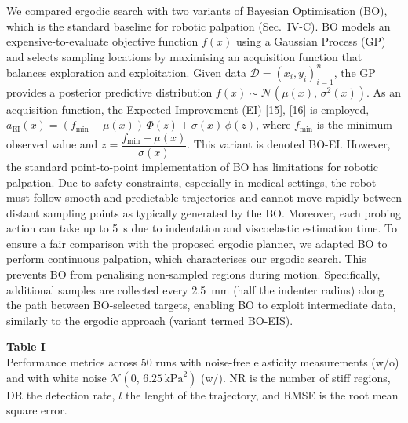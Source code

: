 \documentclass[11pt]{article}
\begin{document}
\noindent
We compared ergodic search with two variants of Bayesian
Optimisation (BO), which is the standard baseline for robotic
palpation (Sec.~IV-C). BO models an expensive-to-evaluate objective
function $f(x)$ using a Gaussian Process (GP) and selects sampling
locations by maximising an acquisition function that balances
exploration and exploitation. Given data
$\mathcal{D} = (x_{i}, y_{i})_{i=1}^{n}$, the GP provides a
posterior predictive distribution
$f(x) \sim \mathcal{N}(\mu(x),\,\sigma^{2}(x))$. As an acquisition
function, the Expected Improvement (EI) [15], [16] is employed,
$a_{\mathrm{EI}}(x) = (f_{\min} - \mu(x))\,\Phi(z) + \sigma(x)\,
\phi(z)$, where $f_{\min}$ is the minimum observed value and
$z = \dfrac{f_{\min} - \mu(x)}{\sigma(x)}$. This variant is denoted
BO-EI. However, the standard point-to-point implementation of BO has
limitations for robotic palpation. Due to safety constraints,
especially in medical settings, the robot must follow smooth and
predictable trajectories and cannot move rapidly between distant
sampling points as typically generated by the BO. Moreover, each
probing action can take up to 5~s due to indentation and
viscoelastic estimation time. To ensure a fair comparison with the
proposed ergodic planner, we adapted BO to perform continuous
palpation, which characterises our ergodic search. This prevents BO
from penalising non-sampled regions during motion. Specifically,
additional samples are collected every 2.5~mm (half the indenter
radius) along the path between BO-selected targets, enabling BO to
exploit intermediate data, similarly to the ergodic approach
(variant termed BO-EIS).

\vspace{0.8em}

\noindent\textbf{Table I}\\[0.2em]
{\small Performance metrics across 50 runs with noise-free elasticity
measurements (w/o) and with white noise $\mathcal{N}(0,\,6.25\,
\mathrm{kPa}^{2})$ (w/). NR is the number of stiff regions, DR the
detection rate, $l$ the lenght of the trajectory, and RMSE is the
root mean square error.}

\vspace{0.3em}
\end{document}
